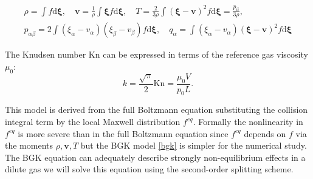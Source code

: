 \documentclass[]{elsarticle} %
\newcommand{\Kn}{\mathrm{Kn}}
\newcommand{\dd}{\mathrm{d}}
\newcommand{\dxi}{\boldsymbol{\dd\xi}}
\newcommand{\refer}[1]{#1_0}
\begin{document}
{\begin{equation}\label{eq:macro}
    \begin{gathered}
    \rho = \int f \dxi, \quad
    \mathbf{v} = \frac1{\rho} \int \boldsymbol{\xi} f \dxi, \quad
    T = \frac{2}{3\rho}\int(\boldsymbol{\xi}-\mathbf{v})^2f \dxi = \frac{p_{ii}}{3\rho}, \\
    p_{\alpha \beta} = 2 \int(\xi_{\alpha}-v_{\alpha})(\xi_{\beta}-v_{\beta}) f \dxi, \quad
    q_{\alpha} = \int(\xi_{\alpha}-v_{\alpha})(\boldsymbol{\xi}-\mathbf{v})^2 f \dxi
    \end{gathered}
\end{equation}


The Knudsen number \(\Kn\) can be expressed in terms of the reference gas viscosity \(\refer\mu\):
\begin{equation}\label{eq:Knudsen_number}
    k = \frac{\sqrt\pi}2\Kn = \frac{\refer\mu V}{\refer{p}L}.
\end{equation}



This   model is  derived from the  full Boltzmann equation  substituting the  collision integral term by the  local Maxwell distribution $f^{eq}$.  Formally the nonlinearity in $f^{eq}$ is  more severe than in the  full Boltzmann equation since  $f^{eq}$  depends  on $f$  via the moments $\rho,\mathbf{v},T$  but the BGK model  \eqref{bgk} is  simpler for the  numerical study. The BGK equation can adequately
describe strongly non-equilibrium effects in a dilute gas we will
solve this equation  using the second-order splitting scheme.


}
\end{document}
